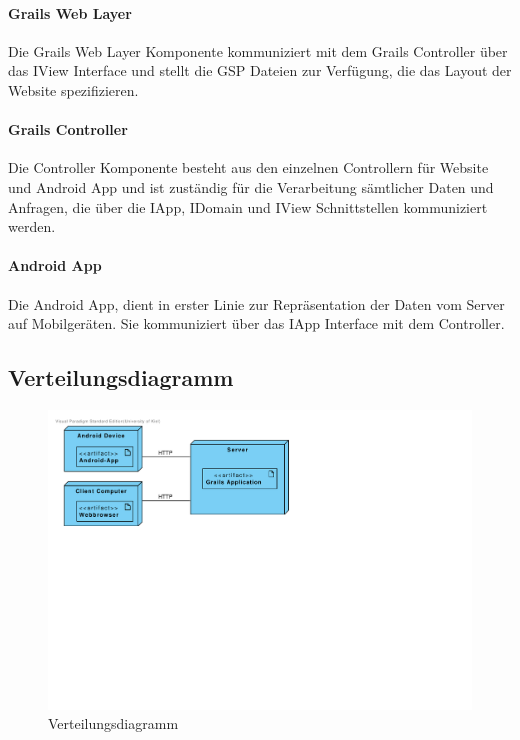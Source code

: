 \paragraph{Grails Web Layer} Die Grails Web Layer Komponente kommuniziert mit dem Grails Controller \"uber das IView Interface und stellt die GSP Dateien zur Verf\"ugung, die das Layout der Website spezifizieren.

\paragraph{Grails Controller} Die Controller Komponente besteht aus den einzelnen Controllern f\"ur Website und Android App und ist zust\"andig f\"ur die Verarbeitung s\"amtlicher Daten und Anfragen, die \"uber die IApp, IDomain und IView Schnittstellen kommuniziert werden.

\paragraph{Android App} Die Android App, dient in erster Linie zur Repr\"asentation der Daten vom Server auf Mobilger\"aten. Sie kommuniziert \"uber das IApp Interface mit dem Controller.

\subsection{Verteilungsdiagramm}

\begin{figure}[H]
  \centering
  \includegraphics[width=\textwidth, trim=1cm 12cm 12cm 1cm, clip]{gfx/deployment_diagram}
  \caption{Verteilungsdiagramm}
\end{figure}

